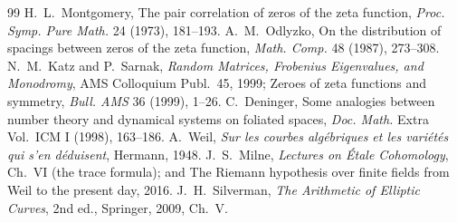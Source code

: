 \documentclass[11pt]{article}
\theoremstyle{definition}
\theoremstyle{remark}
\begin{document}
\begin{thebibliography}{99}
 H.~L.~Montgomery, The pair correlation of zeros of the zeta function, \emph{Proc. Symp. Pure Math.} 24 (1973), 181--193.
 A.~M.~Odlyzko, On the distribution of spacings between zeros of the zeta function, \emph{Math. Comp.} 48 (1987), 273--308.
 N.~M.~Katz and P.~Sarnak, \emph{Random Matrices, Frobenius Eigenvalues, and Monodromy}, AMS Colloquium Publ.\ 45, 1999; Zeroes of zeta functions and symmetry, \emph{Bull. AMS} 36 (1999), 1--26.
 C.~Deninger, Some analogies between number theory and dynamical systems on foliated spaces, \emph{Doc. Math.} Extra Vol.\ ICM I (1998), 163--186.
 A.~Weil, \emph{Sur les courbes alg\'ebriques et les vari\'et\'es qui s'en d\'eduisent}, Hermann, 1948.
 J.~S.~Milne, \emph{Lectures on \'Etale Cohomology}, Ch.\ VI (the trace formula); and The Riemann hypothesis over finite fields from Weil to the present day, 2016.
 J.~H.~Silverman, \emph{The Arithmetic of Elliptic Curves}, 2nd ed., Springer, 2009, Ch.\ V.
\end{thebibliography}
\end{document}
